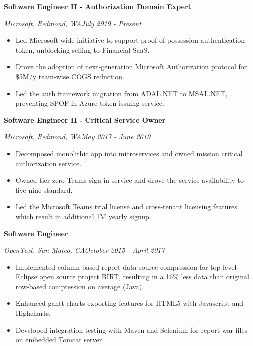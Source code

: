 \documentclass[3pt]{article}
\newenvironment{changemargin}[2]{%
  \begin{list}{}{%
    \setlength{\topsep}{0pt}%
    \setlength{\leftmargin}{#1}%
    \setlength{\rightmargin}{#2}%
    \setlength{\listparindent}{\parindent}%
    \setlength{\itemindent}{\parindent}%
    \setlength{\parsep}{\parskip}%
  }%
  \item[]}{\end{list}
}
\newenvironment{body} {
	\vspace*{-16pt}
	\begin{changemargin}{-0.25in}{-0.5in}
  }	
	{\end{changemargin}
}
\begin{document}
\begin{body}
	\vspace{17pt}
	
   \textbf{Software Engineer II - Authorization Domain Expert} \\
   \vspace{1pt}

    \emph{Microsoft, Redmond, WA}\hfill \emph{July 2019 - Present}\\
     \begin{itemize} \itemsep -0.5pt
    \item {Led Microsoft wide initiative to support proof of possession authentication token, unblocking selling to Financial SaaS.}
    \item {Drove the adoption of next-generation Microsoft Authorization protocol for \$5M/y team-wise COGS reduction.}
    \item {Led the auth framework migration from ADAL.NET to MSAL.NET,  preventing SPOF in Azure token issuing service.}
     \end{itemize}

   \textbf{Software Engineer II - Critical Service Owner} \\
   \vspace{1pt}

    \emph{Microsoft, Redmond, WA}\hfill \emph{May 2017 - June 2019}\\
     \begin{itemize} \itemsep -0.5pt
    \item {Decomposed monolithic app into microservices and owned mission critical authorization service.}
    \item {Owned tier zero Teams sign-in service and drove the service availability to five nine standard.}
     \item {Led the Microsoft Teams trial license and cross-tenant licensing features which result in additional 1M yearly signup.}
     \end{itemize}

    \textbf{Software Engineer} \\
   \vspace{1pt}

    \emph{OpenText, San Mateo, CA}\hfill \emph{October 2015 - April 2017}\\
     \begin{itemize} \itemsep -0.5pt
    \item{Implemented column-based report data source compression for top level Eclipse open source project BIRT, resulting in a 16\% less data than original row-based compression on average (Java).}
     \item {Enhanced gantt charts exporting features for HTML5 with Javascript and Highcharts. } 
     \item {Developed integration testing with Maven and Selenium for report war files on embedded Tomcat server. } 
       \end{itemize}
	

\end{body}
\end{document}
